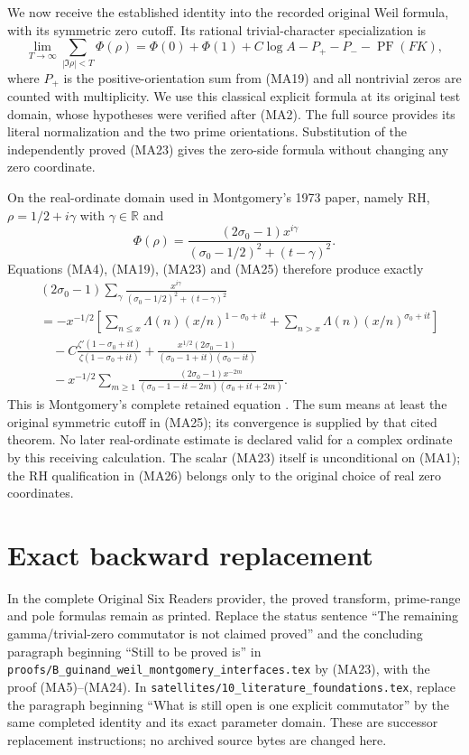 \documentclass[11pt]{article}
\newcommand{\R}{\mathbb R}\newcommand{\C}{\mathbb C}
\newcommand{\PF}{\operatorname{PF}}\newcommand{\dd}{\,d}
\begin{document}
We now receive the established identity into the recorded original Weil
formula, with its symmetric zero cutoff. Its rational trivial-character
specialization is \cite[formula (11)]{Weil}
\begin{equation}\tag{MA25}
 \lim_{T\to\infty}\sum_{|\Im\rho|<T}\Phi(\rho)
 =\Phi(0)+\Phi(1)+C\log A-P_+-P_--\PF(FK),
\end{equation}
where $P_+$ is the positive-orientation sum from (MA19) and all nontrivial
zeros are counted with multiplicity. We use this classical explicit formula
at its original test domain, whose hypotheses were verified after (MA2).
The full source provides its literal normalization and the two prime orientations.
Substitution of the independently proved (MA23) gives the zero-side formula
without changing any zero coordinate.

On the real-ordinate domain used in Montgomery's 1973 paper, namely RH,
$\rho=1/2+i\gamma$ with $\gamma\in\R$ and
\[
 \Phi(\rho)=\frac{(2\sigma_0-1)x^{i\gamma}}
 { (\sigma_0-1/2)^2+(t-\gamma)^2}.
\]
Equations (MA4), (MA19), (MA23) and (MA25) therefore produce exactly
\begin{equation}\tag{MA26}\begin{aligned}
 &(2\sigma_0-1)\sum_\gamma
 \frac{x^{i\gamma}}{(\sigma_0-1/2)^2+(t-\gamma)^2}\\
 &=-x^{-1/2}\left[
 \sum_{n\le x}\Lambda(n)(x/n)^{1-\sigma_0+it}
 +\sum_{n>x}\Lambda(n)(x/n)^{\sigma_0+it}\right]\\
 &\quad-C\frac{\zeta'(1-\sigma_0+it)}{\zeta(1-\sigma_0+it)}
 +\frac{x^{1/2}(2\sigma_0-1)}{(\sigma_0-1+it)(\sigma_0-it)}\\
 &\quad-x^{-1/2}\sum_{m\ge1}
 \frac{(2\sigma_0-1)x^{-2m}}
 {(\sigma_0-1-it-2m)(\sigma_0+it+2m)}.
\end{aligned}\end{equation}
This is Montgomery's complete retained equation \cite[pp.~185--187]{Montgomery}.
The sum means at least the original symmetric cutoff in (MA25); its
convergence is supplied by that cited theorem. No later real-ordinate estimate
is declared valid for a complex ordinate by this receiving calculation.
The scalar (MA23) itself is unconditional on (MA1); the RH qualification in
(MA26) belongs only to the original choice of real zero coordinates.

\section{Exact backward replacement}
In the complete Original Six Readers provider, the proved transform,
prime-range and pole formulas remain as printed. Replace the status sentence
``The remaining gamma/trivial-zero commutator is not claimed proved'' and
the concluding paragraph beginning ``Still to be proved is'' in
\texttt{proofs/B\_guinand\_weil\_montgomery\_interfaces.tex} by (MA23),
with the proof (MA5)--(MA24). In
\texttt{satellites/10\_literature\_foundations.tex}, replace the paragraph
beginning ``What is still open is one explicit commutator'' by the same
completed identity and its exact parameter domain. These are successor
replacement instructions; no archived source bytes are changed here.
\end{document}
